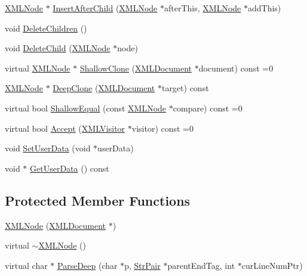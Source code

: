 \begin{DoxyCompactItemize}
\mbox{\hyperlink{classtinyxml2_1_1_x_m_l_node}{X\+M\+L\+Node}} $\ast$ \mbox{\hyperlink{classtinyxml2_1_1_x_m_l_node_a9275138a1b8dd5d8e2c26789bdc23ac8}{Insert\+After\+Child}} (\mbox{\hyperlink{classtinyxml2_1_1_x_m_l_node}{X\+M\+L\+Node}} $\ast$after\+This, \mbox{\hyperlink{classtinyxml2_1_1_x_m_l_node}{X\+M\+L\+Node}} $\ast$add\+This)
\item 
void \mbox{\hyperlink{classtinyxml2_1_1_x_m_l_node_a0360085cc54df5bff85d5c5da13afdce}{Delete\+Children}} ()
\item 
void \mbox{\hyperlink{classtinyxml2_1_1_x_m_l_node_a363b6edbd6ebd55f8387d2b89f2b0921}{Delete\+Child}} (\mbox{\hyperlink{classtinyxml2_1_1_x_m_l_node}{X\+M\+L\+Node}} $\ast$node)
\item 
virtual \mbox{\hyperlink{classtinyxml2_1_1_x_m_l_node}{X\+M\+L\+Node}} $\ast$ \mbox{\hyperlink{classtinyxml2_1_1_x_m_l_node_a8402cbd3129d20e9e6024bbcc0531283}{Shallow\+Clone}} (\mbox{\hyperlink{classtinyxml2_1_1_x_m_l_document}{X\+M\+L\+Document}} $\ast$document) const =0
\item 
\mbox{\hyperlink{classtinyxml2_1_1_x_m_l_node}{X\+M\+L\+Node}} $\ast$ \mbox{\hyperlink{classtinyxml2_1_1_x_m_l_node_a3bb369fd733f1989b751d99a9417adab}{Deep\+Clone}} (\mbox{\hyperlink{classtinyxml2_1_1_x_m_l_document}{X\+M\+L\+Document}} $\ast$target) const
\item 
virtual bool \mbox{\hyperlink{classtinyxml2_1_1_x_m_l_node_a7ce18b751c3ea09eac292dca264f9226}{Shallow\+Equal}} (const \mbox{\hyperlink{classtinyxml2_1_1_x_m_l_node}{X\+M\+L\+Node}} $\ast$compare) const =0
\item 
virtual bool \mbox{\hyperlink{classtinyxml2_1_1_x_m_l_node_a81e66df0a44c67a7af17f3b77a152785}{Accept}} (\mbox{\hyperlink{classtinyxml2_1_1_x_m_l_visitor}{X\+M\+L\+Visitor}} $\ast$visitor) const =0
\item 
void \mbox{\hyperlink{classtinyxml2_1_1_x_m_l_node_a002978fc889cc011d143185f2377eca2}{Set\+User\+Data}} (void $\ast$user\+Data)
\item 
void $\ast$ \mbox{\hyperlink{classtinyxml2_1_1_x_m_l_node_a7f0687574afa03bc479dc44f29db0afe}{Get\+User\+Data}} () const
\end{DoxyCompactItemize}
\subsection*{Protected Member Functions}
\begin{DoxyCompactItemize}
\item 
\mbox{\hyperlink{classtinyxml2_1_1_x_m_l_node_a29868df6ca383d574f584dfdd15105b6}{X\+M\+L\+Node}} (\mbox{\hyperlink{classtinyxml2_1_1_x_m_l_document}{X\+M\+L\+Document}} $\ast$)
\item 
virtual \mbox{\hyperlink{classtinyxml2_1_1_x_m_l_node_a8f41e898cdd4da4cdbb7f05b0c7d9f69}{$\sim$\+X\+M\+L\+Node}} ()
\item 
virtual char $\ast$ \mbox{\hyperlink{classtinyxml2_1_1_x_m_l_node_a916e498914baecbc9a1f012352ef7c69}{Parse\+Deep}} (char $\ast$p, \mbox{\hyperlink{classtinyxml2_1_1_str_pair}{Str\+Pair}} $\ast$parent\+End\+Tag, int $\ast$cur\+Line\+Num\+Ptr)
\end{DoxyCompactItemize}
